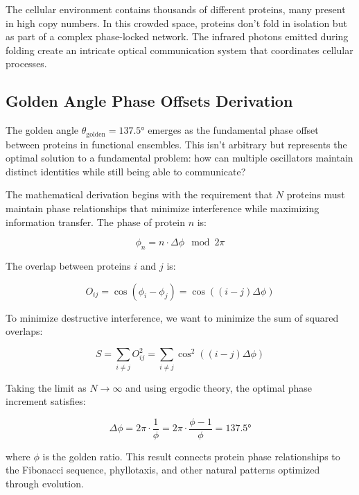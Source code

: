 \documentclass[12pt,a4paper]{report}
\begin{document}
The cellular environment contains thousands of different proteins, many present in high copy numbers. In this crowded space, proteins don't fold in isolation but as part of a complex phase-locked network. The infrared photons emitted during folding create an intricate optical communication system that coordinates cellular processes.

\subsection{Golden Angle Phase Offsets Derivation}

The golden angle $\theta_{\text{golden}} = 137.5°$ emerges as the fundamental phase offset between proteins in functional ensembles. This isn't arbitrary but represents the optimal solution to a fundamental problem: how can multiple oscillators maintain distinct identities while still being able to communicate?

The mathematical derivation begins with the requirement that $N$ proteins must maintain phase relationships that minimize interference while maximizing information transfer. The phase of protein $n$ is:

\begin{equation}
\phi_n = n \cdot \Delta\phi \mod 2\pi
\end{equation}

The overlap between proteins $i$ and $j$ is:

\begin{equation}
O_{ij} = \cos(\phi_i - \phi_j) = \cos((i-j)\Delta\phi)
\end{equation}

To minimize destructive interference, we want to minimize the sum of squared overlaps:

\begin{equation}
S = \sum_{i \neq j} O_{ij}^2 = \sum_{i \neq j} \cos^2((i-j)\Delta\phi)
\end{equation}

Taking the limit as $N \to \infty$ and using ergodic theory, the optimal phase increment satisfies:

\begin{equation}
\Delta\phi = 2\pi \cdot \frac{1}{\phi} = 2\pi \cdot \frac{\phi - 1}{\phi} = 137.5°
\end{equation}

where $\phi$ is the golden ratio. This result connects protein phase relationships to the Fibonacci sequence, phyllotaxis, and other natural patterns optimized through evolution.
\end{document}
